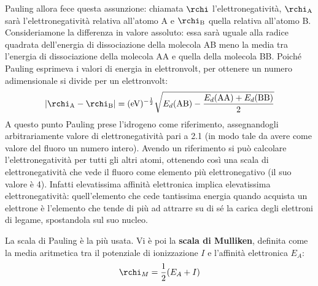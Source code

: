 Pauling allora fece questa assunzione: chiamata $\rchi$ l'elettronegatività, $\rchi_{\rm A}$ sarà l'elettronegatività relativa all'atomo A e $\rchi_{\rm B}$ quella relativa all'atomo B. Consideriamone la differenza in valore assoluto: essa sarà uguale alla radice quadrata dell'energia di dissociazione della molecola AB meno la media tra l'energia di dissociazione della molecola AA e quella della molecola BB. Poiché Pauling esprimeva i valori di energia in elettronvolt, per ottenere un numero adimensionale si divide per un elettronvolt:
\begin{equation*}
    |\rchi_{\rm A} - \rchi_{\rm B}|
    =(\text{eV})^{-\frac{1}{2}}\sqrt{E_d(\text{AB}) - \frac{E_d(\text{AA}) + E_d(\text{BB})}{2}}
\end{equation*}
A questo punto Pauling prese l'idrogeno come riferimento, assegnandogli arbitrariamente valore di elettronegatività pari a 2.1 (in modo tale da avere come valore del fluoro un numero intero). Avendo un riferimento si può calcolare l'elettronegatività per tutti gli altri atomi, ottenendo così una scala di elettronegatività che vede il fluoro come elemento più elettronegativo (il suo valore è 4). Infatti elevatissima affinità elettronica implica elevatissima elettronegatività: quell'elemento che cede tantissima energia quando acquista un elettrone è l'elemento che tende di più ad attrarre su di sé la carica degli elettroni di legame, spostandola sul suo nucleo.

\vspace{0.2cm}La scala di Pauling è la più usata. Vi è poi la \textbf{scala di Mulliken}, definita come la media aritmetica tra il potenziale di ionizzazione $I$ e l'affinità elettronica $E_A$:
\begin{equation*}
    \rchi_M=\frac{1}{2}(E_A + I)
\end{equation*}